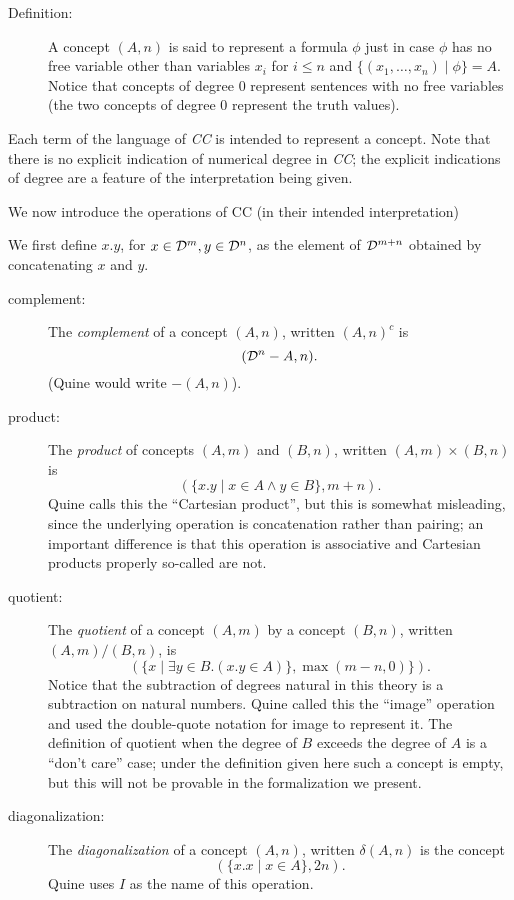 \documentclass{article}
\begin{document}
\begin{description}

\item[Definition:] A concept $(A,n)$ is said to represent a formula
$\phi$ just in case $\phi$ has no free variable other than variables
$x_i$ for $i \leq n$ and $\{(x_1,\ldots,x_n) \mid \phi\} = A$.  Notice
that concepts of degree 0 represent sentences with no free variables
(the two concepts of degree 0 represent the truth values).

\end{description}

Each term of the language of {\em CC\/} is intended to represent a
concept.  Note that there is no explicit indication of numerical
degree in {\em CC\/}; the explicit indications of degree are a feature
of the interpretation being given.

We now introduce the operations of CC (in their intended interpretation)

We first define $x.y$, for $x \in {\cal D}^m, y \in {\cal D}^n$, as
the element of ${\cal D}^{m+n}$ obtained by concatenating $x$ and $y$.

\begin{description}

\item[complement:] The {\em complement\/} of a concept $(A,n)$,
written $(A,n)^c$ is $$({\cal D}^n-A,n).$$ (Quine would write $-(A,n)$).

\item[product:] The {\em product\/} of concepts $(A,m)$ and $(B,n)$,
written $(A,m)\times (B,n)$ is $$(\{x.y\mid x\in A \wedge y \in
B\},m+n).$$ Quine calls this the ``Cartesian product'', but this is
somewhat misleading, since the underlying operation is concatenation
rather than pairing; an important difference is that this operation is
associative and Cartesian products properly so-called are not.

\item[quotient:] The {\em quotient\/} of a concept $(A,m)$ by a
concept $(B,n)$, written $(A,m)/(B,n)$, is $$(\{x \mid \exists y \in
B. (x.y \in A)\},\max(m-n,0)\}).$$ Notice that the subtraction of
degrees natural in this theory is a subtraction on natural numbers.
Quine called this the ``image'' operation and used the double-quote
notation for image to represent it.  The definition of quotient when
the degree of $B$ exceeds the degree of $A$ is a ``don't care'' case;
under the definition given here such a concept is empty, but this will
not be provable in the formalization we present.

\item[diagonalization:] The {\em diagonalization\/} of a concept
$(A,n)$, written $\delta(A,n)$ is the concept $$(\{x.x\mid x \in
A\},2n).$$  Quine uses $I$ as the name of this operation.
\end{description}
\end{document}
